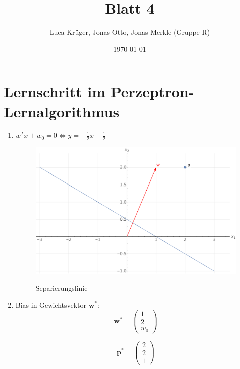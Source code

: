 \documentclass{article}
\title{Blatt 4}
\author{Luca Krüger, Jonas Otto, Jonas Merkle (Gruppe R)}
\date{\today}
\begin{document}
\maketitle

\section{Lernschritt im Perzeptron-Lernalgorithmus}

\begin{enumerate}[label=\arabic*.]
  \item $w^Tx+w_0 = 0 \iff y = -\frac{1}{2}x+\frac{1}{2}$
        \begin{figure}[H]
          \textit{}\centering
          \includegraphics[width=\textwidth]{separation-line1.pdf}
          \caption{Separierungslinie}
        \end{figure}
  \item Bias in Gewichtsvektor $\mathbf{w}^*$:
        \begin{equation*}
          \mathbf{w}^* = \begin{pmatrix}
            1 \\ 2 \\ w_0
          \end{pmatrix}
        \end{equation*}

        \begin{equation*}
          \mathbf{p}^* = \begin{pmatrix}
            2 \\ 2 \\ 1
          \end{pmatrix}
        \end{equation*}


\end{enumerate}
\end{document}
